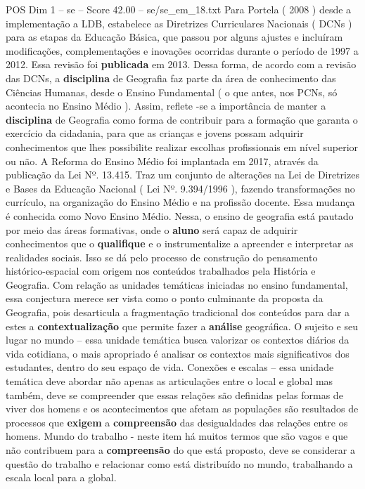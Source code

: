 \begin{textsample}{POS Dim 1 – se – Score 42.00 – se/se\_em\_18.txt}
Para Portela ( 2008 ) desde a implementação a LDB, estabelece as Diretrizes Curriculares Nacionais ( DCNs ) para as etapas da Educação Básica, que passou por alguns ajustes e incluíram modificações, complementações e inovações ocorridas durante o período de 1997 a 2012.
Essa revisão foi \textbf{publicada} em 2013.
Dessa forma, de acordo com a revisão das DCNs, a \textbf{disciplina} de Geografia faz parte da área de conhecimento das Ciências Humanas, desde o Ensino Fundamental ( o que antes, nos PCNs, só acontecia no Ensino Médio ).
Assim, reflete -se a importância de manter a \textbf{disciplina} de Geografia como forma de contribuir para a formação que garanta o exercício da cidadania, para que as crianças e jovens possam adquirir conhecimentos que lhes possibilite realizar escolhas profissionais em nível superior ou não.
A Reforma do Ensino Médio foi implantada em 2017, através da publicação da Lei Nº. 13.415.
Traz um conjunto de alterações na Lei de Diretrizes e Bases da Educação Nacional ( Lei Nº. 9.394/1996 ), fazendo transformações no currículo, na organização do Ensino Médio e na profissão docente.
Essa mudança é conhecida como Novo Ensino Médio.
Nessa, o ensino de geografia está pautado por meio das áreas formativas, onde o \textbf{aluno} será capaz de adquirir conhecimentos que o \textbf{qualifique} e o instrumentalize a apreender e interpretar as realidades sociais.
Isso se dá pelo processo de construção do pensamento histórico-espacial com origem nos conteúdos trabalhados pela História e Geografia.
Com relação as unidades temáticas iniciadas no ensino fundamental, essa conjectura merece ser vista como o ponto culminante da proposta da Geografia, pois desarticula a fragmentação tradicional dos conteúdos para dar a estes a \textbf{contextualização} que permite fazer a \textbf{análise} geográfica.
O sujeito e seu lugar no mundo – essa unidade temática busca valorizar os contextos diários da vida cotidiana, o mais apropriado é analisar os contextos mais significativos dos estudantes, dentro do seu espaço de vida.
Conexões e escalas – essa unidade temática deve abordar não apenas as articulações entre o local e global mas também, deve se compreender que essas relações são definidas pelas formas de viver dos homens e os acontecimentos que afetam as populações são resultados de processos que \textbf{exigem} a \textbf{compreensão} das desigualdades das relações entre os homens.
Mundo do trabalho - neste item há muitos termos que são vagos e que não contribuem para a \textbf{compreensão} do que está proposto, deve se considerar a questão do trabalho e relacionar como está distribuído no mundo, trabalhando a escala local para a global.

\end{textsample}
